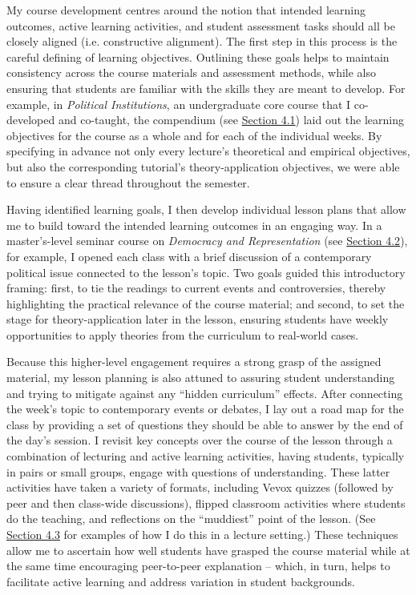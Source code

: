 \documentclass[11pt]{article}
\begin{document}
My course development centres around the notion that intended learning outcomes, active learning activities, and student assessment tasks should all be closely aligned (i.e. constructive alignment). The first step in this process is the careful defining of learning objectives. Outlining these goals helps to maintain consistency across the course materials and assessment methods, while also ensuring that students are familiar with the skills they are meant to develop. For example, in \textit{Political Institutions}, an undergraduate core course that I co-developed and co-taught, the compendium (see \hyperref[sec:compendium]{Section 4.1}) laid out the learning objectives for the course as a whole and for each of the individual weeks. By specifying in advance not only every lecture's theoretical and empirical objectives, but also the corresponding tutorial's theory-application objectives, we were able to ensure a clear thread throughout the semester. 

Having identified learning goals, I then develop individual lesson plans that allow me to build toward the intended learning outcomes in an engaging way. In a master's-level seminar course on \textit{Democracy and Representation} (see \hyperref[sec:syllabus]{Section 4.2}), for example, I opened each class with a brief discussion of a contemporary political issue connected to the lesson's topic. Two goals guided this introductory framing: first, to tie the readings to current events and controversies, thereby highlighting the practical relevance of the course material; and second, to set the stage for theory-application later in the lesson, ensuring students have weekly opportunities to apply theories from the curriculum to real-world cases. 

Because this higher-level engagement requires a strong grasp of the assigned material, my lesson planning is also attuned to assuring student understanding and trying to mitigate against any ``hidden curriculum'' effects. After connecting the week's topic to contemporary events or debates, I lay out a road map for the class by providing a set of questions they should be able to answer by the end of the day's session. I revisit key concepts over the course of the lesson through a combination of lecturing and active learning activities, having students, typically in pairs or small groups, engage with questions of understanding. These latter activities have taken a variety of formats, including Vevox quizzes (followed by peer and then class-wide discussions), flipped classroom activities where students do the teaching, and reflections on the ``muddiest'' point of the lesson. (See \hyperref[sec:activities]{Section 4.3} for examples of how I do this in a lecture setting.) These techniques allow me to ascertain how well students have grasped the course material while at the same time encouraging peer-to-peer explanation -- which, in turn, helps to facilitate active learning and address variation in student backgrounds.
\end{document}
